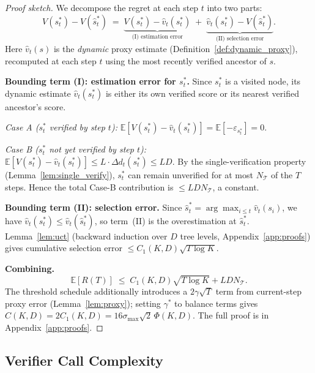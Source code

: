 \begin{proof}[Proof sketch]
We decompose the regret at each step $t$ into two parts:
\[
  V(s^*_t) - V(\hat{s}^*_t)
  \;=\;
  \underbrace{V(s^*_t) - \hat{v}_t(s^*_t)}_{\text{(I) estimation error}}
  \;+\;
  \underbrace{\hat{v}_t(s^*_t) - V(\hat{s}^*_t)}_{\text{(II) selection error}}.
\]
Here $\hat{v}_t(s)$ is the \emph{dynamic} proxy estimate (Definition~\ref{def:dynamic_proxy}),
recomputed at each step $t$ using the most recently verified ancestor of $s$.

\textbf{Bounding term (I): estimation error for $s^*_t$.}
Since $s^*_t$ is a visited node, its dynamic estimate $\hat{v}_t(s^*_t)$ is either its
own verified score or its nearest verified ancestor's score.

\emph{Case A ($s^*_t$ verified by step $t$):}
$\mathbb{E}[V(s^*_t) - \hat{v}_t(s^*_t)] = \mathbb{E}[-\varepsilon_{s^*_t}] = 0$.

\emph{Case B ($s^*_t$ not yet verified by step $t$):}
$\mathbb{E}[V(s^*_t) - \hat{v}_t(s^*_t)] \leq L\cdot\Delta d_t(s^*_t) \leq LD$.
By the single-verification property (Lemma~\ref{lem:single_verify}),
$s^*_t$ can remain unverified for at most $N_{\mathcal{T}}$ of the $T$ steps.
Hence the total Case-B contribution is $\leq LDN_{\mathcal{T}}$, a constant.

\textbf{Bounding term (II): selection error.}
Since $\hat{s}^*_t = \arg\max_{i \leq t}\hat{v}_t(s_i)$, we have
$\hat{v}_t(s^*_t) \leq \hat{v}_t(\hat{s}^*_t)$, so term~(II) is the overestimation
at $\hat{s}^*_t$.  Lemma~\ref{lem:uct} (backward induction over $D$ tree levels,
Appendix~\ref{app:proofs}) gives cumulative selection error
$\leq C_1(K,D)\sqrt{T\log K}$.

\textbf{Combining.}
\[
  \mathbb{E}[R(T)]
  \;\leq\; C_1(K,D)\sqrt{T\log K} + LDN_{\mathcal{T}}.
\]
The threshold schedule additionally introduces a $2\gamma\sqrt{T}$ term from
current-step proxy error (Lemma~\ref{lem:proxy}); setting $\gamma^*$ to balance
terms gives $C(K,D) = 2C_1(K,D) = 16\sigma_{\max}\sqrt{2}\,\Phi(K,D)$.
The full proof is in Appendix~\ref{app:proofs}.
\end{proof}

\subsection{Verifier Call Complexity}

